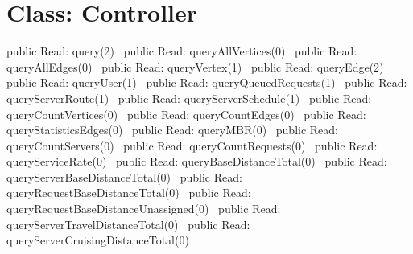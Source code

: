 \section*{Class: Controller}
\nwenddocs{}\endmoddef{}
public \LA{}Read: query(2)~{\nwtagstyle{}}\RA{}
public \LA{}Read: queryAllVertices(0)~{\nwtagstyle{}}\RA{}
public \LA{}Read: queryAllEdges(0)~{\nwtagstyle{}}\RA{}
public \LA{}Read: queryVertex(1)~{\nwtagstyle{}}\RA{}
public \LA{}Read: queryEdge(2)~{\nwtagstyle{}}\RA{}
public \LA{}Read: queryUser(1)~{\nwtagstyle{}}\RA{}
public \LA{}Read: queryQueuedRequests(1)~{\nwtagstyle{}}\RA{}
public \LA{}Read: queryServerRoute(1)~{\nwtagstyle{}}\RA{}
public \LA{}Read: queryServerSchedule(1)~{\nwtagstyle{}}\RA{}
public \LA{}Read: queryCountVertices(0)~{\nwtagstyle{}}\RA{}
public \LA{}Read: queryCountEdges(0)~{\nwtagstyle{}}\RA{}
public \LA{}Read: queryStatisticsEdges(0)~{\nwtagstyle{}}\RA{}
public \LA{}Read: queryMBR(0)~{\nwtagstyle{}}\RA{}
public \LA{}Read: queryCountServers(0)~{\nwtagstyle{}}\RA{}
public \LA{}Read: queryCountRequests(0)~{\nwtagstyle{}}\RA{}
public \LA{}Read: queryServiceRate(0)~{\nwtagstyle{}}\RA{}
public \LA{}Read: queryBaseDistanceTotal(0)~{\nwtagstyle{}}\RA{}
public \LA{}Read: queryServerBaseDistanceTotal(0)~{\nwtagstyle{}}\RA{}
public \LA{}Read: queryRequestBaseDistanceTotal(0)~{\nwtagstyle{}}\RA{}
public \LA{}Read: queryRequestBaseDistanceUnassigned(0)~{\nwtagstyle{}}\RA{}
public \LA{}Read: queryServerTravelDistanceTotal(0)~{\nwtagstyle{}}\RA{}
public \LA{}Read: queryServerCruisingDistanceTotal(0)~{\nwtagstyle{}}\RA{}
